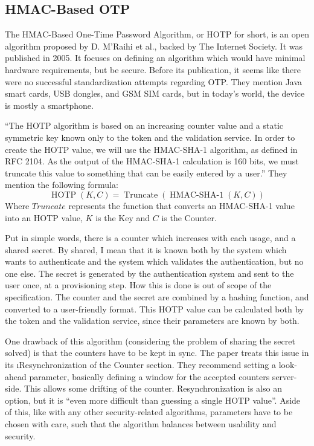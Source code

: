 \subsection{HMAC-Based OTP} \label{lab:ch3-hmac}
The HMAC-Based One-Time Password Algorithm, or HOTP for short, is an open algorithm proposed by D. M'Raihi et al.\cite{hotp}, backed by The Internet Society.
It was published in 2005.
It focuses on defining an algorithm which would have minimal hardware requirements, but be secure.
Before its publication, it seems like there were no successful standardization attempts regarding OTP.
They mention Java smart cards, USB dongles, and GSM SIM cards, but in today's world, the device is mostly a smartphone.

``The HOTP algorithm is based on an increasing counter value and a static symmetric key known only to the token and the validation service.
In order to create the HOTP value, we will use the HMAC-SHA-1 algorithm, as defined in RFC 2104.
As the output of the HMAC-SHA-1 calculation is 160 bits, we must truncate this value to something that can be easily entered by a user.''
They mention the following formula:
\begin{equation} \label{eq:ch3-hotp}
\operatorname{HOTP}(K,C) = \operatorname{Truncate}(\operatorname{HMAC-SHA-1}(K,C))
\end{equation}
Where $Truncate$ represents the function that converts an HMAC-SHA-1 value into an HOTP value, $K$ is the Key and $C$ is the Counter.

Put in simple words, there is a counter which increases with each usage, and a shared secret.
By shared, I mean that it is known both by the system which wants to authenticate and the system which validates the authentication, but no one else.
The secret is generated by the authentication system and sent to the user once, at a provisioning step.
How this is done is out of scope of the specification.
The counter and the secret are combined by a hashing function, and converted to a user-friendly format.
This HOTP value can be calculated both by the token and the validation service, since their parameters are known by both.

One drawback of this algorithm (considering the problem of sharing the secret solved) is that the counters have to be kept in sync.
The paper treats this issue in its \i{Resynchronization of the Counter} section.
They recommend setting a look-ahead parameter, basically defining a window for the accepted counters server-side.
This allows some drifting of the counter.
Resynchronization is also an option, but it is ``even more difficult than guessing a single HOTP value''.
Aside of this, like with any other security-related algorithms, parameters have to be chosen with care, such that the algorithm balances between usability and security.


